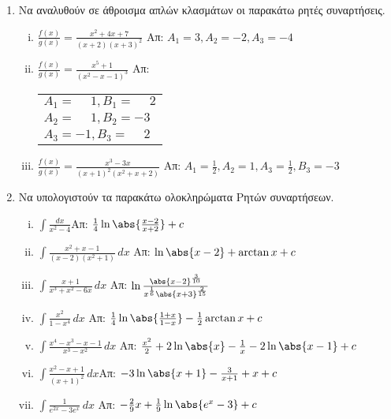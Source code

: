 





\begin{center}
  \minibox{\bfseries\large \textcolor{Col1}{Ολοκληρώματα Ρητών και Άρρητων Συναρτήσεων}}
\end{center}

\vspace{2\baselineskip}

\everymath{\displaystyle}

\pagestyle{empty}

\begin{enumerate}

\item Να αναλυθούν σε άθροισμα απλών κλασμάτων οι παρακάτω ρητές συναρτήσεις.

\begin{enumerate}[i)]
\item $\frac{f(x)}{g(x)}=\frac{x^2+4x+7}{(x+2)(x+3)^2}$ \hfill Απ: $A_1=3, A_2=-2, A_3=-4$
\item $\frac{f(x)}{g(x)}=\frac{x^5+1}{(x^2-x-1)^3}$ \hfill Απ: \begin{tabular}{l} 
$A_1=\phantom{-}1, B_1=\phantom{-}2$ \\ $A_2=\phantom{-}1, B_2=-3$ \\ $A_3=-1, B_3=\phantom{-}2$
\end{tabular}
\item $\frac{f(x)}{g(x)}=\frac{x^3-3x}{(x+1)^2(x^2+x+2)}$ \hfill Απ: $A_1=\frac{1}{2}, A_2=1, A_3=\frac{1}{2}, B_3=-3$
\end{enumerate}

\item Να υπολογιστούν τα παρακάτω ολοκληρώματα Ρητών συναρτήσεων.

\begin{enumerate}[i)]
\item $\int\frac{dx}{x^2-4}$\hfill Απ: $\frac{1}{4}\ln\abs{\frac{x-2}{x+2}}+c$
\item $\int\frac{x^2+x-1}{(x-2)(x^2+1)}\,dx$ \hfill Απ: $\ln\abs{x-2}+\arctan x+c$
\item $\int\frac{x+1}{x^3+x^2-6x}\,dx$ \hfill Απ: $\ln\frac{\abs{x-2}^{\frac{3}{10}}}{x^{\frac{1}{6}}\abs{x+3}^{\frac{2}{15}}}$
\item $\int\frac{x^2}{1-x^4}\,dx$ \hfill Απ: $\frac{1}{4}\ln\abs{\frac{1+x}{1-x}}-\frac{1}{2}\arctan x+c$
\item $\int\frac{x^4-x^3-x-1}{x^3-x^2}\,dx$ \hfill Απ: $\frac{x^2}{2}+2\ln\abs{x}-\frac{1}{x}-2\ln\abs{x-1}+c$
\item $\int \frac{x^2-x+1}{(x+1)^2}\,dx$\hfill Απ: $-3\ln\abs{x+1}-\frac{3}{x+1}+x+c$
\item $\int\frac{1}{e^{2x}-3e^{x}}\,dx$ \hfill Απ: $-\frac{2}{9}x+\frac{1}{9}\ln\abs{e^x-3}+c$
\end{enumerate}




\end{enumerate}
